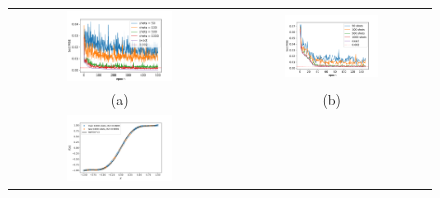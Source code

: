 \documentclass[12pt, a4paper,  nobibnotes]{article}
\begin{document}
\renewcommand{\thisfigurewidth}{0.5}
\begin{figure}[H]
    \centering
    \begin{tabular}{cc}
      \includegraphics[width=\thisfigurewidth\textwidth]{figures/tanh-test-mse-bs=4-lr=0_001-shotsearch.pdf} & 
      \includegraphics[width=\thisfigurewidth\textwidth]{figures/iv-test-mse-bs=4-lr=0_001-shotsearch.pdf} \\
      (a) & (b) \\[6.5pt]
      \includegraphics[width=\thisfigurewidth\textwidth]{figures/tanh-results-bs=16-lr=0_001-s1000.pdf} & 

\end{tabular}
\end{figure}
\end{document}
